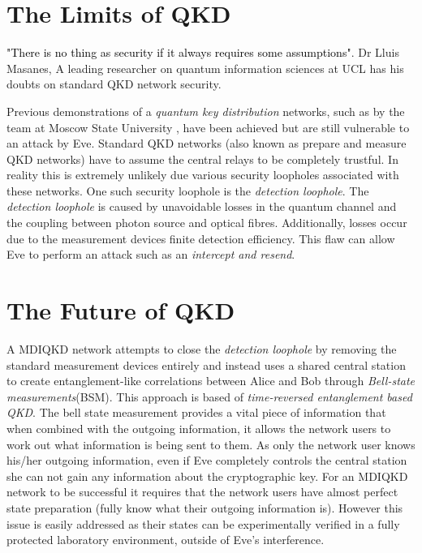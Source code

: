 \documentclass[journal]{vgtc}
\begin{document}
 


\section{The Limits of QKD}
\textcolor{black}{"There is no thing as security if it always requires some assumptions"}. Dr Lluis Masanes,  A leading researcher on quantum information sciences at UCL has his doubts on standard QKD network security.   

\vspace{0.3cm}

\noindent Previous demonstrations of a \textit{quantum key distribution} networks, such as by the team at Moscow State University\cite{2017QuEle..47..798K} , have been achieved but are still vulnerable to an attack by Eve. Standard QKD networks (also known as prepare and measure QKD networks) have to assume the central relays to be completely trustful. In reality this is extremely unlikely due various security loopholes associated with these networks. One such security loophole is the \textit{detection loophole}. The \textit{detection loophole} is caused by unavoidable losses in the quantum channel and the coupling between photon source and optical fibres. Additionally, losses occur due to the measurement devices finite detection efficiency. This flaw can allow Eve to perform an attack such as an \textit{intercept and resend}.



\section{The Future of QKD}


A MDIQKD network attempts to close the \textit{detection loophole} by removing the standard measurement devices entirely and instead uses a shared  central station to create entanglement-like correlations between Alice and Bob through \textit{Bell-state measurements}(BSM). This approach is based of \textit{time-reversed entanglement based QKD}\cite{PhysRevA.54.2651}. The bell state measurement provides a vital piece of information that when combined with the outgoing information, it allows the network users to work out what information is being sent to them. As only the network user knows his/her outgoing information, even if Eve completely controls the central station she can not gain any information about the cryptographic key. For an MDIQKD network to be successful it requires that the network users have almost perfect state preparation (fully know what their outgoing information is). However this issue is easily addressed as their states can be experimentally verified in a fully protected laboratory environment, outside of Eve's interference.  
\end{document}
